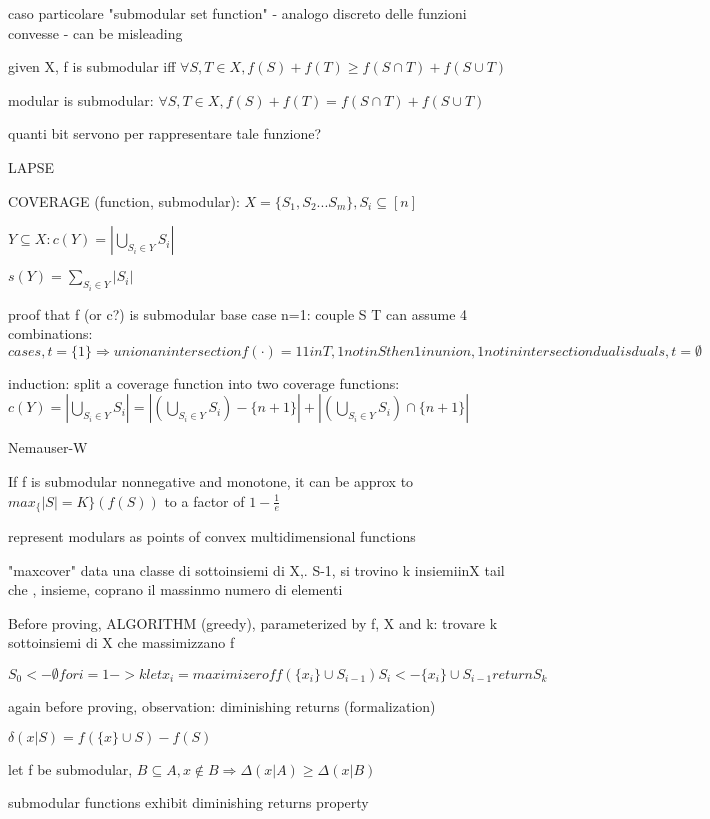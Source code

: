 \documentclass{report}
\begin{document}
	caso particolare "submodular set function" - analogo discreto delle funzioni convesse - can be misleading
	
	given X, f is submodular iff $\forall S, T \in X, f(S)+f(T) \geq f(S\cap T) + f(S\cup T)$
	
	modular is submodular: $\forall S, T \in X, f(S)+f(T) = f(S\cap T) + f(S\cup T)$

	quanti bit servono per rappresentare tale funzione?
	
	LAPSE
	
	COVERAGE (function, submodular): $X=\{S_1, S_2...S_m\}, S_i \subseteq [n]$
	
	$Y\subseteq X : c(Y) = |\bigcup_{S_i \in Y}S_i|$
	
	
	$s(Y) = \sum_{S_i \in Y} |S_i|$
	
	
	proof that f (or c?) is submodular
	base case n=1: couple S T can assume 4 combinations: $
	case s, t = \{1\} \Rightarrow union an intersection f(\cdot)= 1	
	1 in T, 1 not in S then 1 in union, 1 not in intersection
	dual is dual
	s, t = \emptyset
	$
	
	induction: split a coverage function into two coverage functions: $c(Y) = |\bigcup_{S_i \in Y}S_i| = |(\bigcup_{S_i \in Y}S_i)-\{n+1\}| + |(\bigcup_{S_i \in Y}S_i) \cap \{n+1\}|$
	
	Nemauser-W
	
	If f is submodular nonnegative and monotone, it can be approx to $max_\{|S|=K\}(f(S))$ to a factor of $1- \frac{1}{e}$
	
	represent modulars as points of convex multidimensional functions
	
	
	"maxcover" data una classe di sottoinsiemi di X,. S-1, si trovino k insiemiinX tail che , insieme, coprano il massinmo numero di elementi
	
	
	Before proving, ALGORITHM (greedy), parameterized by f, X and k: trovare k sottoinsiemi di X che massimizzano f
	
	$
	S_0 <- \emptyset
	for i=1 -> k
		let x_i = maximizer of f(\{x_i\} \cup S_{i-1})
		S_i <- \{x_i\} \cup S_{i-1}		
	return S_k
	$
	
	again before proving, observation: diminishing returns (formalization)
	
	$\delta(x|S) = f(\{x\}\cup S) - f(S)$ %
	
	let f be submodular, $B \subseteq A, x \notin B \Rightarrow \Delta(x|A) \geq \Delta(x|B)$ %
	
	submodular functions exhibit diminishing returns property
	
\end{document}

